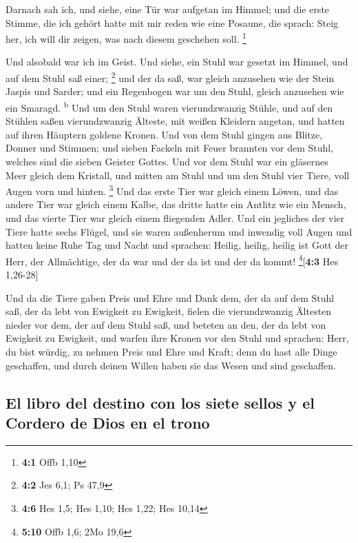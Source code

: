  Darnach sah ich, und siehe, eine Tür war aufgetan im
Himmel; und die erste Stimme, die ich gehört hatte mit mir reden wie
eine Posaune, die sprach: Steig her, ich will dir zeigen, was nach
diesem geschehen soll. \footnote{\textbf{4:1} Offb 1,10}

 Und alsobald war ich im Geist. Und siehe, ein Stuhl war
gesetzt im Himmel, und auf dem Stuhl saß einer; \footnote{\textbf{4:2}
  Jes 6,1; Ps 47,9}  und der da saß, war gleich anzusehen
wie der Stein Jaspis und Sarder; und ein Regenbogen war um den Stuhl,
gleich anzusehen wie ein Smaragd. \textsuperscript{b}  Und
um den Stuhl waren vierundzwanzig Stühle, und auf den Stühlen saßen
vierundzwanzig Älteste, mit weißen Kleidern angetan, und hatten auf
ihren Häuptern goldene Kronen.  Und von dem Stuhl gingen
aus Blitze, Donner und Stimmen; und sieben Fackeln mit Feuer brannten
vor dem Stuhl, welches sind die sieben Geister Gottes. 
Und vor dem Stuhl war ein gläsernes Meer gleich dem Kristall, und mitten
am Stuhl und um den Stuhl vier Tiere, voll Augen vorn und hinten.
\footnote{\textbf{4:6} Hes 1,5; Hes 1,10; Hes 1,22; Hes 10,14}
 Und das erste Tier war gleich einem Löwen, und das andere
Tier war gleich einem Kalbe, das dritte hatte ein Antlitz wie ein
Mensch, und das vierte Tier war gleich einem fliegenden Adler.
 Und ein jegliches der vier Tiere hatte sechs Flügel, und
sie waren außenherum und inwendig voll Augen und hatten keine Ruhe Tag
und Nacht und sprachen: Heilig, heilig, heilig ist Gott der Herr, der
Allmächtige, der da war und der da ist und der da kommt!
\footnote{\textbf{5:10} Offb 1,6; 2Mo 19,6}{[}\textbf{4:3} Hes
1,26-28{]}

 Und da die Tiere gaben Preis und Ehre und Dank dem, der
da auf dem Stuhl saß, der da lebt von Ewigkeit zu Ewigkeit,
 fielen die vierundzwanzig Ältesten nieder vor dem, der
auf dem Stuhl saß, und beteten an den, der da lebt von Ewigkeit zu
Ewigkeit, und warfen ihre Kronen vor den Stuhl und sprachen:
 Herr, du bist würdig, zu nehmen Preis und Ehre und
Kraft; denn du hast alle Dinge geschaffen, und durch deinen Willen haben
sie das Wesen und sind geschaffen.

\hypertarget{el-libro-del-destino-con-los-siete-sellos-y-el-cordero-de-dios-en-el-trono}{%
\subsection{El libro del destino con los siete sellos y el Cordero de
Dios en el
trono}\label{el-libro-del-destino-con-los-siete-sellos-y-el-cordero-de-dios-en-el-trono}}

